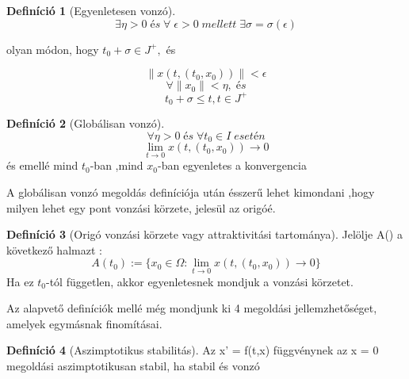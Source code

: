 \documentclass{article}
\theoremstyle{definition}
\theoremstyle{theorem}
\newtheorem{definition}{Definíció}
\begin{document}
\begin{definition}[Egyenletesen vonzó]
\begin{equation*}
  \exists \eta > 0 \;és \; \forall \; \epsilon > 0 \;mellett \; \exists \sigma = \sigma(\epsilon)
\end{equation*}
\begin{center}
olyan módon, hogy $t_0 + \sigma \in J^+,$ és
\end{center}
\begin{equation*}
    \lVert x(t,(t_0,x_0)) \rVert < \epsilon
\end{equation*}
\begin{equation*}
    \forall \lVert x_0 \rVert < \eta, \;és
\end{equation*}
\begin{equation*}
    t_0 + \sigma \leq t, t \in J^+
\end{equation*}
\end{definition}

\begin{definition}[Globálisan vonzó]
\begin{equation*}
    \forall \eta > 0 \;és\; \forall t_0 \in I\;esetén
\end{equation*}
\begin{equation*}
     \lim_{t\to 0} x(t,(t_0,x_0))  \rightarrow 0
\end{equation*}
és emellé mind $t_0$-ban ,mind $x_0$-ban egyenletes a konvergencia
\end{definition}

A globálisan vonzó megoldás definíciója után ésszerű lehet kimondani ,hogy milyen lehet egy pont vonzási körzete, jelesül az origóé.

\begin{definition}[Origó vonzási körzete vagy attraktivitási tartománya]
Jelölje A() a következő halmazt :
\begin{equation*}
    A(t_0) := \{ x_0 \in \Omega : \lim_{t\to 0} x(t,(t_0,x_0))  \rightarrow 0 \}
\end{equation*}
Ha ez $t_0$-tól független, akkor egyenletesnek mondjuk a vonzási körzetet.
\end{definition}

Az alapvető definíciók mellé még mondjunk ki 4 megoldási jellemzhetőséget, amelyek egymásnak finomításai.

\begin{definition}[Aszimptotikus stabilitás]
Az x' = f(t,x) függvénynek az x = 0 megoldási aszimptotikusan stabil, ha stabil és vonzó
\end{definition}
\end{document}
